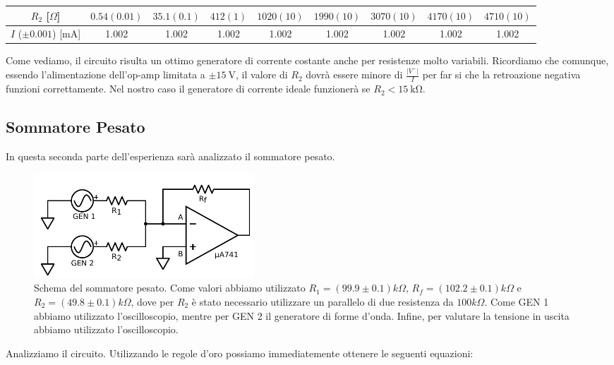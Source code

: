 \begin{center}
\begin{tabular}{c|c|c|c|c|c|c|c|c}
$R_2$ [$\Omega$] & $0.54(0.01)$ & $35.1(0.1)$ & $412(1)$ & $1020(10)$ & $1990(10)$ & $3070(10)$ & $4170(10)$ & $4710(10)$ \\ 
\hline 
$I$ ($\pm 0.001$) [$\si{\milli\ampere}$] & 1.002 & 1.002 & 1.002 & 1.002 & 1.002 & 1.002 & 1.002 & 1.002 \\ 
\end{tabular}
\end{center}

Come vediamo, il circuito risulta un ottimo generatore di corrente costante anche per resistenze molto variabili. Ricordiamo che comunque, essendo l'alimentazione dell'op-amp limitata a $\pm \SI{15}{\volt}$, il valore di $R_2$ dovrà essere minore di $\frac{|V^-|}{I}$ per far si che la retroazione negativa funzioni correttamente. Nel nostro caso il generatore di corrente ideale funzionerà se $R_2< \SI{15}{\kilo\ohm}$.




\subsection{Sommatore Pesato}

In questa seconda parte dell'esperienza sarà analizzato il sommatore pesato. 

\begin{figure}
  \begin{center}
    \includegraphics[width=0.40\textwidth]{../E01/latex/c2.pdf}
  \end{center}
  \caption{Schema del sommatore pesato. Come valori abbiamo utilizzato $R_1=(99.9 \pm 0.1) k \Omega$, $R_f=(102.2 \pm 0.1) k \Omega$ e $R_2=(49.8 \pm 0.1) k \Omega$, dove per $R_2$ è stato necessario utilizzare un parallelo di due resistenza da $100 k\Omega$. Come GEN 1 abbiamo utilizzato l'oscilloscopio, mentre per GEN 2 il generatore di forme d'onda. Infine, per valutare la tensione in uscita abbiamo utilizzato l'oscilloscopio.}
\end{figure}

Analizziamo il circuito. Utilizzando le regole d'oro possiamo immediatemente ottenere le seguenti equazioni:

